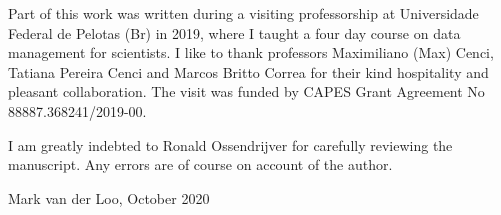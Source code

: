 

Part of this work was written during a visiting professorship at Universidade
Federal de Pelotas (Br) in 2019, where I taught a four day course on data
management for scientists. I like to thank professors Maximiliano (Max) Cenci,
Tatiana Pereira Cenci and Marcos Britto Correa for their kind hospitality and
pleasant collaboration. The visit was funded by CAPES 
Grant Agreement No 88887.368241/2019-00.

I am greatly indebted to Ronald Ossendrijver for carefully reviewing the
manuscript.  Any errors are of course on account of the author.


\hfill{} Mark van der Loo, October 2020

